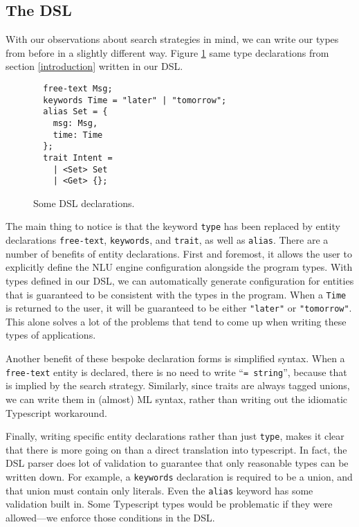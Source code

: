 \documentclass[twocolumn]{article}
\newcommand{\ts}[1]{\texttt{#1}}
\begin{document}
\subsection{The DSL}
With our observations about search strategies in mind, we can write our types
from before in a slightly different way. Figure \ref{fig:dsl_decls} same type
declarations from section \ref{introduction} written in our DSL.

\begin{figure}
\begin{verbatim}
  free-text Msg;
  keywords Time = "later" | "tomorrow";
  alias Set = {
    msg: Msg,
    time: Time
  };
  trait Intent =
    | <Set> Set
    | <Get> {};
\end{verbatim}
  \caption{Some DSL declarations.}
  \label{fig:dsl_decls}
\end{figure}

The main thing to notice is that the keyword \ts{type} has been replaced by
entity declarations \ts{free-text}, \ts{keywords}, and \ts{trait}, as well as
\ts{alias}. There are a number of benefits of entity declarations. First and
foremost, it allows the user to explicitly define the NLU engine configuration
alongside the program types. With types defined in our DSL, we can automatically
generate configuration for entities that is guaranteed to be consistent with the
types in the program. When a \ts{Time} is returned to the user, it will be
guaranteed to be either \ts{"later"} or \ts{"tomorrow"}. This alone solves a lot
of the problems that tend to come up when writing these types of applications.

Another benefit of these bespoke declaration forms is simplified syntax. When a
\ts{free-text} entity is declared, there is no need to write ``\ts{= string}'',
because that is implied by the search strategy. Similarly, since traits are
always tagged unions, we can write them in (almost) ML syntax, rather than
writing out the idiomatic Typescript workaround.

Finally, writing specific entity declarations rather than just \ts{type}, makes
it clear that there is more going on than a direct translation into typescript.
In fact, the DSL parser does lot of validation to guarantee that only reasonable
types can be written down. For example, a \ts{keywords} declaration is required
to be a union, and that union must contain only literals. Even the \ts{alias}
keyword has some validation built in. Some Typescript types would be problematic
if they were allowed---we enforce those conditions in the DSL.
\end{document}
